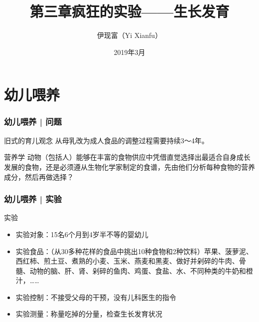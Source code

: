 



\title[生长发育]{第三章\quad 疯狂的实验——生长发育}
\author[Yixf]{伊现富（Yi Xianfu）}
\date{2019年3月}



\section{幼儿喂养}
\begin{frame}
  \frametitle{幼儿喂养 | 问题}
  \begin{block}{旧式的育儿观念}
    从母乳改为成人食品的调整过程需要持续3～4年。
  \end{block}
  \pause
  \begin{block}{营养学}
    动物（包括人）能够在丰富的食物供应中凭借直觉选择出最适合自身成长发展的食物，还是必须遵从生物化学家制定的食谱，先由他们分析每种食物的营养成分，然后再做选择？
  \end{block}
\end{frame}

\begin{frame}
  \frametitle{幼儿喂养 | 实验}
  \begin{block}{实验}
    \begin{itemize}
      \item 实验对象：15名6个月到4岁半不等的婴幼儿
      \item 实验食品：（从30多种花样的食品中挑出10种食物和2种饮料）苹果、菠萝泥、西红柿、煎土豆、煮熟的小麦、玉米、燕麦和黑麦、做好并剁碎的牛肉、骨髓、动物的脑、肝、肾、剁碎的鱼肉、鸡蛋、食盐、水、不同种类的牛奶和橙汁，……
      \item 实验控制：不接受父母的干预，没有儿科医生的指令
      \item 实验测量：称量吃掉的分量，检查生长发育状况
    \end{itemize}
  \end{block}
\end{frame}

